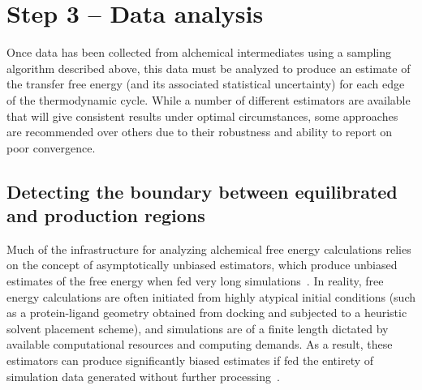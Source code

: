 \documentclass[9pt,bestpractices]{livecoms}
\begin{document}
\section{Step 3 -- Data analysis}
\label{sec:step3}

Once data has been collected from alchemical intermediates using a sampling algorithm described above, this data must be analyzed to produce an estimate of the transfer free energy (and its associated statistical uncertainty) for each edge of the thermodynamic cycle.
While a number of different estimators are available that will give consistent results under optimal circumstances, some approaches are recommended over others due to their robustness and ability to report on poor convergence.

\subsection*{Detecting the boundary between equilibrated and production regions}
\label{sec:automatic-equilibration-detection}

Much of the infrastructure for analyzing alchemical free energy calculations relies on the concept of asymptotically unbiased estimators, which produce unbiased estimates of the free energy when fed very long simulations~\cite{shirts2005comparison}.
In reality, free energy calculations are often initiated from highly atypical initial conditions (such as a protein-ligand geometry obtained from docking and subjected to a heuristic solvent placement scheme), and simulations are of a finite length dictated by available computational resources and computing demands.
As a result, these estimators can produce significantly biased estimates if fed the entirety of simulation data generated without further processing~\cite{chodera2016simple}.
\end{document}
